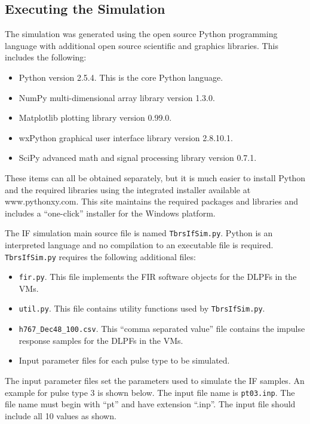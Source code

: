 \documentclass[12pt,english]{article}
\begin{document}
\subsection{Executing the Simulation}

The simulation was generated using the open source Python programming
language with additional open source scientific and graphics
libraries. This includes the following:
\begin{itemize}

\item Python version 2.5.4. This is the core Python language.

\item NumPy multi-dimensional array library version 1.3.0.

\item Matplotlib plotting library version 0.99.0.

\item wxPython graphical user interface library version 2.8.10.1.

\item SciPy advanced math and signal processing library version 0.7.1.

\end{itemize}
These items can all be obtained separately, but it is much easier to
install Python and the required libraries using the integrated
installer available at www.pythonxy.com. This site maintains the
required packages and libraries and includes a ``one-click'' installer
for the Windows platform.

The IF simulation main source file is named \texttt{TbrsIfSim.py}.
Python is an interpreted language and no compilation to an executable
file is required. \texttt{TbrsIfSim.py} requires the following
additional files:
\begin{itemize}

\item \texttt{fir.py}. This file implements the FIR software objects
for the DLPFs in the VMs.

\item \texttt{util.py}. This file contains utility functions used by
\texttt{TbrsIfSim.py}.

\item \texttt{h767\_Dec48\_100.csv}. This ``comma separated value'' file
contains the impulse response samples for the DLPFs in the VMs.

\item Input parameter files for each pulse type to be simulated.

\end{itemize}
The input parameter files set the parameters used to simulate the IF
samples. An example for pulse type 3 is shown below. The input file
name is \texttt{pt03.inp}. The file name must begin with ``pt'' and
have extension ``.inp''. The input file should include all 10 values
as shown.
\end{document}
